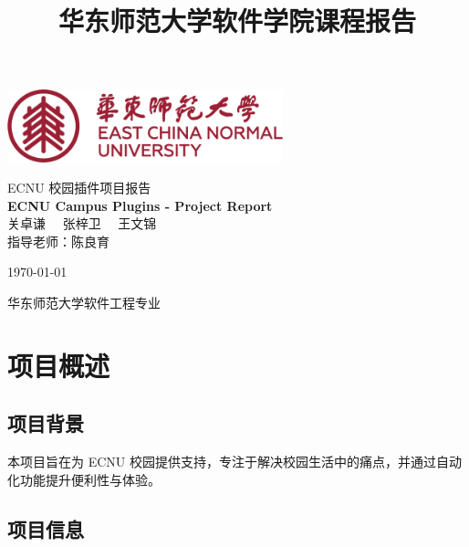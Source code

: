 \documentclass[14pt,a4paper,UTF8,twoside]{article}
\date{} %
\title{华东师范大学软件学院课程报告} %
\begin{document}
\begin{titlepage}
    \centering
    \vspace*{2cm}
    
    \includegraphics[width=0.6\textwidth]{img/ECNULogo.png}\par\vspace{1cm}
    
    {\heiti {} ECNU 校园插件项目报告}\\[1.5cm] 
    
    {\bfseries{} ECNU Campus Plugins - Project Report}\\[1.5cm]

    {\kaishu {} 关卓谦 \ \ 张梓卫 \ \ 王文锦}\\[1cm]
    
    { 指导老师：陈良育}\\[1cm] 
    
    \vfill
    
    { \today}
    
    \vspace{1cm}
    
    { 华东师范大学软件工程专业}

\end{titlepage}

\newpage{} %

\tableofcontents

\newpage{} %

\section{项目概述}

\subsection{项目背景}

本项目旨在为 ECNU 校园提供支持，专注于解决校园生活中的痛点，并通过自动化功能提升便利性与体验。

\subsection{项目信息}
\end{document}

